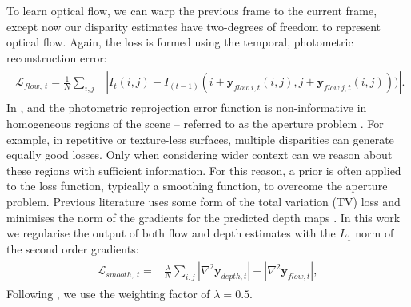 
To learn optical flow, we can warp the previous frame to the current frame, except now our disparity estimates have two-degrees of freedom to represent optical flow. Again, the loss is formed using the temporal, photometric reconstruction error:
\begin{align}
\begin{split}
\mathcal{L}_{flow,~t} = \frac{1}{N} \sum_{i,j}& | I_t(i,j) - I_{(t-1)}(i+\mathbf{y}_{flow~i,t}(i,j),j+\mathbf{y}_{flow~j,t}(i,j))) |.
\label{eqn:flow}
\end{split}
\end{align}
In ,  and  the photometric reprojection error function is non-informative in homogeneous regions of the scene -- referred to as the aperture problem \citep{hartley2000}. For example, in repetitive or texture-less surfaces, multiple disparities can generate equally good losses. Only when considering wider context can we reason about these regions with sufficient information. For this reason, a prior is often applied to the loss function, typically a smoothing function, to overcome the aperture problem. Previous literature uses some form of the total variation (TV) loss \citep{rudin1992nonlinear} and minimises the norm of the gradients for the predicted depth maps \citep{garg2016unsupervised,zhou2017unsupervised}. In this work we regularise the output of both flow and depth estimates with the $L_1$ norm of the second order gradients:
\begin{align}
\begin{split}
\mathcal{L}_{smooth,~t} =& \frac{\lambda}{N} \sum_{i,j}  | \nabla^2 \mathbf{y}_{depth,t} | + | \nabla^2 \mathbf{y}_{flow,t} |,
\end{split}
\label{eqn:smoothing}
\end{align}
Following \citep{zhou2017unsupervised}, we use the weighting factor of $\lambda = 0.5$.

